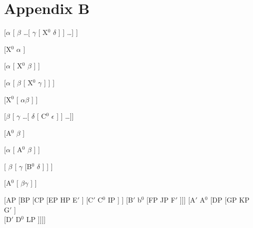 \documentclass[11pt,twoside]{article}
\begin{document}
\section*{Appendix B}\label{psappend}%

\begin{phrase string}{}
[$\alpha$ [ $\beta$ \ldots [ $\gamma$ [ X$^{0}$ $\delta$ ] ] \ldots ] ] 
\end{phrase string}

\begin{phrase string}{} 
[X$^{0}$ $\alpha$ ]
\end{phrase string}

\begin{phrase string}{}
[$\alpha$ [ X$^{0}$ $\beta$ ] ]
\end{phrase string}

\begin{phrase string}{} 
[$\alpha$ [ $\beta$ [ X$^{0}$ $\gamma$ ] ] ]
\end{phrase string}

\begin{phrase string}{}
[X$^{0}$ [ $\alpha \beta$ ] ] 
\end{phrase string}

\begin{phrase string}{} 
[$\beta$ [ $\gamma$ \ldots [ $\delta$ [ C$^{0}$ $\epsilon$ ] ] \ldots ]]	
\end{phrase string}
 
\begin{phrase string}{} 
[A$^{0}$ $\beta$ ] 																											  
\end{phrase string}

\begin{phrase string}{}
[$\alpha$ [ A$^{0}$ $\beta$ ] ]																					  
\end{phrase string}

\begin{phrase string}{}
[ $\beta$ [ $\gamma$ [B$^{0}$ $\delta$ ] ] ]																
\end{phrase string}

\begin{phrase string}{}
[A$^{0}$ [ $\beta \gamma$ ] ]																						      
\end{phrase string}

\begin{phrase string}{}
[AP [BP [CP [EP HP E$'$ ] [C$'$ C$^{0}$ IP ] ] [B$'$ b$^{0}$ [FP JP F$'$ ]]] [A$'$ A$^{0}$ [DP [GP KP G$'$ ]\\

[D$'$ D$^{0}$ LP ]]]]
\end{phrase string}
\end{document}
